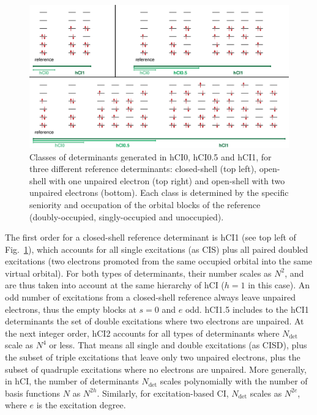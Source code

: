 \documentclass[aip,jcp,reprint,noshowkeys,superscriptaddress]{revtex4-1}
\newcommand{\Ndet}{N_\text{det}}
\begin{document}
\begin{figure}%
\includegraphics[width=1.0\linewidth]{determinants}
\caption{Classes of determinants generated in hCI0, hCI0.5 and hCI1, for three different reference determinants:
closed-shell (top left), open-shell with one unpaired electron (top right) and open-shell with two unpaired electrons (bottom).
Each class is determined by the specific seniority and occupation of the orbital blocks of the reference (doubly-occupied, singly-occupied and unoccupied).
}
\label{fig:determinants}
\end{figure}

The first order for a closed-shell reference determinant is hCI1 (see top left of Fig.~\ref{fig:determinants}), which accounts for all single excitations (as CIS) 
plus all paired doubled excitations (two electrons promoted from the same occupied orbital into the same virtual orbital).
For both types of determinants, their number scales as $N^2$, and are thus taken into account at the same hierarchy of hCI ($h=1$ in this case).
An odd number of excitations from a closed-shell reference always leave unpaired electrons, thus the empty blocks at $s=0$ and $e$ odd.
hCI1.5 includes to the hCI1 determinants the set of double excitations where two electrons are unpaired.
At the next integer order, hCI2 accounts for all types of determinants where $\Ndet$ scale as $N^4$ or less.
That means all single and double excitations (as CISD), plus the subset of triple excitations that leave only two unpaired electrons, 
plus the subset of quadruple excitations where no electrons are unpaired.
More generally, in hCI, the number of determinants $\Ndet$ scales polynomially with the number of basis functions $N$ as $N^{2h}$.
Similarly, for excitation-based CI, $\Ndet$ scales as $N^{2e}$, where $e$ is the excitation degree.
 
\end{document}
